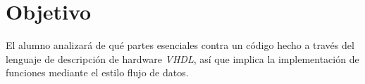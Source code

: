 \documentclass[../main.tex]{subfiles}
\begin{document}
\section{Objetivo}
El alumno analizará de qué partes esenciales contra un código hecho a través 
del lenguaje de descripción de hardware \textit{VHDL}, así que implica la 
implementación de funciones mediante el estilo flujo de datos.
\end{document}
